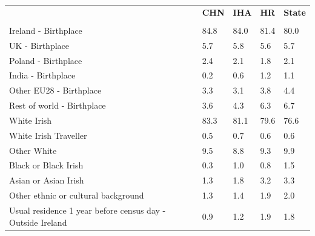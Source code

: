 \documentclass{article}
\begin{document}
\pagebreak
\begin{table}[h]	
\centering
		\begin{tabular}{KTTTT}
  \hline
& \textbf{CHN} & \textbf{IHA} & \textbf{HR}& \textbf{State}\\ 
  \hline
    \\ 
    \hline
Ireland - Birthplace & 84.8& 84.0& 81.4& 80.0\\
UK - Birthplace & 5.7& 5.8& 5.6& 5.7\\
Poland - Birthplace & 2.4& 2.1& 1.8& 2.1\\
India - Birthplace & 0.2& 0.6& 1.2& 1.1\\
Other EU28 - Birthplace & 3.3& 3.1& 3.8& 4.4\\
Rest of world - Birthplace & 3.6& 4.3& 6.3& 6.7\\
    \hline
White Irish & 83.3& 81.1& 79.6& 76.6\\
White Irish Traveller & 0.5& 0.7& 0.6& 0.6\\
Other White & 9.5& 8.8& 9.3& 9.9\\
Black or Black Irish & 0.3& 1.0& 0.8& 1.5\\
Asian or Asian Irish & 1.3& 1.8& 3.2& 3.3\\
Other ethnic or cultural background & 1.3& 1.4& 1.9& 2.0\\
    \hline
Usual residence 1 year before census day - Outside Ireland & 0.9& 1.2& 1.9& 1.8\\


\end{tabular}
\end{table}
\end{document}
